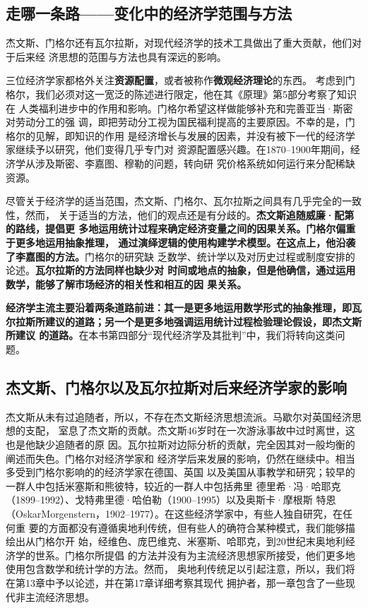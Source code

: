\subsection{走哪一条路——变化中的经济学范围与方法}

杰文斯、门格尔还有瓦尔拉斯，对现代经济学的技术工具做出了重大贡献，他们对于后来经
济思想的范围与方法也具有深远的影响。

三位经济学家都格外关注\textbf{资源配置}，或者被称作\textbf{微观经济理论}的东西。
考虑到门格尔，我们必须对这一宽泛的陈述进行限定，他在其《原理》第5部分考察了知识在
人类福利进步中的作用和影响。门格尔希望这样做能够补充和完善亚当·斯密对劳动分工的强
调，即把劳动分工视为国民福利提高的主要原因。不幸的是，门格尔的见解，即知识的作用
是经济增长与发展的因素，并没有被下一代的经济学家继续予以研究，他们变得几乎专门对
资源配置感兴趣。在1870--1900年期间，经济学从涉及斯密、李嘉图、穆勒的问题，转向研
究价格系统如何运行来分配稀缺资源。

尽管关于经济学的适当范围，杰文斯、门格尔、瓦尔拉斯之间具有几乎完全的一致性，然而，
关于适当的方法，他们的观点还是有分歧的。\textbf{杰文斯追随威廉·配第的路线，提倡更
  多地运用统计过程来确定经济变量之间的因果关系。门格尔偏重于更多地运用抽象推理，
  通过演绎逻辑的使用构建学术模型。在这点上，他沿袭了李嘉图的方法。}门格尔的研究缺
乏数学、统计学以及对历史过程或制度安排的论述。\textbf{瓦尔拉斯的方法同样也缺少对
  时间或地点的抽象，但是他确信，通过运用数学，能够了解市场经济的相关性和相互的因
  果关系。}

\textbf{经济学主流主要沿着两条道路前进：其一是更多地运用数学形式的抽象推理，即瓦
  尔拉斯所建议的道路；另一个是更多地强调运用统计过程检验理论假设，即杰文斯所建议
  的道路。}在本书第四部分“现代经济学及其批判”中，我们将转向这类问题。

\subsection{杰文斯、门格尔以及瓦尔拉斯对后来经济学家的影响}

杰文斯从未有过追随者，所以，不存在杰文斯经济思想流派。马歇尔对英国经济思想的支配，
室息了杰文斯的贡献。杰文斯46岁时在一次游泳事故中过时离世，这也是他缺少追随者的原
因。瓦尔拉斯对边际分析的贡献，完全因其对一般均衡的阐述而失色。门格尔对经济学家和
经济学后来发展的影响，仍然在继续中。相当多受到门格尔影响的的经济学家在德国、英国
以及美国从事教学和研究；较早的一群人中包括米塞斯和熊彼特，较近的一群人中包括弗里
德里希·冯·哈耶克（1899--1992）、戈特弗里德·哈伯勒（1900--1995）以及奥斯卡·摩根斯
特恩（OskarMorgenstern，1902--1977）。在这些经济学家中，有些人独自研究，在任何重
要的方面都没有遵循奥地利传统，但有些人的确符合某种模式，我们能够描绘出从门格尔开
始，经维色、庞巴维克、米塞斯、哈耶克，到20世纪末奥地利经济学的世系。门格尔所提倡
的方法并没有为主流经济思想家所接受，他们更多地使用包含数学和统计学的方法。然而，
奥地利传统足以引起注意，所以，我们将在第13章中予以论述，并在第17章详细考察其现代
拥护者，那一章包含了一些现代非主流经济思想。

